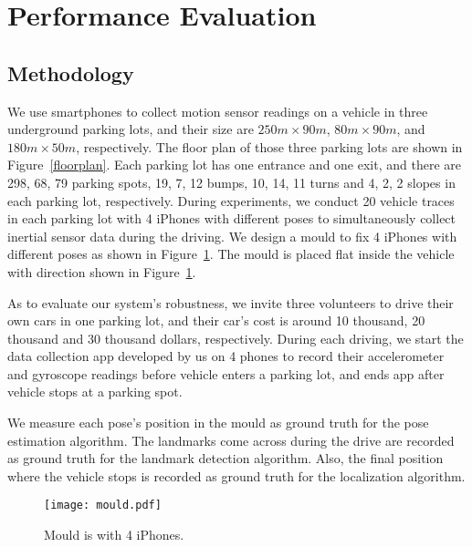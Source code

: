 \section{Performance Evaluation}\label{sec:evaluation}

\subsection{Methodology}

\begin{figure*}[t]
      \centering
      \vspace{-2pt}
        \vfill
        \caption{Floor map of three underground parking lots: (a) parking lot 1: $250m\times 90m$ with 298 parking spots, 19 bumps and 10 turns. (b) parking lot 2: $80m\times 90m$ with 68 parking spots, 7 bumps and 14 turns. (c) parking lot 3: $180m\times 50m$ with 79 parking spots, 12 bumps and 11 turns. }\label{floorplan}
\end{figure*}

We use smartphones to collect motion sensor readings on a vehicle in three underground parking lots, and their size are $250m\times 90m$, $80m\times 90m$, and $180m\times 50m$, respectively. The floor plan of those three parking lots are shown in Figure~\ref{floorplan}. Each parking lot has one entrance and one exit, and there are 298, 68, 79 parking spots, 19, 7, 12 bumps, 10, 14, 11 turns and 4, 2, 2 slopes in each parking lot, respectively. During experiments, we conduct 20 vehicle traces in each parking lot with 4 iPhones with different poses to simultaneously collect inertial sensor data during the driving.
We design a mould to fix 4 iPhones with different poses as shown in Figure~\ref{pix:mould}. The mould is placed flat inside the vehicle with direction shown in Figure~\ref{pix:mould}.

As to evaluate our system's robustness, we invite three volunteers to drive their own cars in one parking lot, and their car's cost is around 10 thousand, 20 thousand and 30 thousand dollars, respectively.
During each driving, we start the data collection app developed by us on 4 phones to record their accelerometer and gyroscope readings before vehicle enters a parking lot, and ends app after vehicle stops at a parking spot.

We measure each pose's position in the mould as ground truth for the pose estimation algorithm.
The landmarks come across during the drive are recorded as ground truth for the landmark detection algorithm.
Also, the final position where the vehicle stops is recorded as ground truth for the localization algorithm.
\begin{figure}[h]
  \centering
  \texttt{[image: mould.pdf]}\\
  \vspace{5pt}
  \caption{Mould is with 4 iPhones. }\label{pix:mould}
\end{figure}

